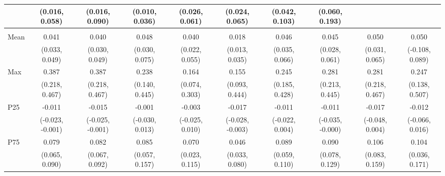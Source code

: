 {\begin{tabular}{l|c|c|c|c|c|c|c|c|c}
& {\scriptsize (0.016, 0.058)}
& {\scriptsize (0.016, 0.090)}
& {\scriptsize (0.010, 0.036)}
& {\scriptsize (0.026, 0.061)}
& {\scriptsize (0.024, 0.065)}
& {\scriptsize (0.042, 0.103)}
& {\scriptsize (0.060, 0.193)}
\\ [0.1cm]
\hline
\noalign{\smallskip}
\multicolumn{10}{l}{\textbf{Effect with Leads and Lags}} \\
\noalign{\smallskip}
\hline
Mean
& 0.041 & 0.040 & 0.048 & 0.040 & 0.018 & 0.046 & 0.045 & 0.050 & 0.050 \\
& {\scriptsize (0.033, 0.049)}
& {\scriptsize (0.030, 0.049)}
& {\scriptsize (0.030, 0.075)}
& {\scriptsize (0.022, 0.055)}
& {\scriptsize (0.013, 0.035)}
& {\scriptsize (0.035, 0.066)}
& {\scriptsize (0.028, 0.061)}
& {\scriptsize (0.031, 0.065)}
& {\scriptsize (-0.108, 0.089)}
\\ [0.1cm]
\hline
Max
& 0.387 & 0.387 & 0.238 & 0.164 & 0.155 & 0.245 & 0.281 & 0.281 & 0.247 \\
& {\scriptsize (0.218, 0.467)}
& {\scriptsize (0.218, 0.467)}
& {\scriptsize (0.140, 0.445)}
& {\scriptsize (0.074, 0.303)}
& {\scriptsize (0.093, 0.444)}
& {\scriptsize (0.185, 0.428)}
& {\scriptsize (0.213, 0.445)}
& {\scriptsize (0.218, 0.467)}
& {\scriptsize (0.138, 0.507)}
\\ [0.1cm]
\hline
P25
& -0.011 & -0.015 & -0.001 & -0.003 & -0.017 & -0.011 & -0.011 & -0.017 & -0.012 \\
& {\scriptsize (-0.023, -0.001)}
& {\scriptsize (-0.025, -0.001)}
& {\scriptsize (-0.030, 0.013)}
& {\scriptsize (-0.025, 0.010)}
& {\scriptsize (-0.028, -0.003)}
& {\scriptsize (-0.022, 0.004)}
& {\scriptsize (-0.035, -0.000)}
& {\scriptsize (-0.048, 0.004)}
& {\scriptsize (-0.066, 0.016)}
\\ [0.1cm]
\hline
P75
& 0.079 & 0.082 & 0.085 & 0.070 & 0.046 & 0.089 & 0.090 & 0.106 & 0.104 \\
& {\scriptsize (0.065, 0.090)}
& {\scriptsize (0.067, 0.092)}
& {\scriptsize (0.057, 0.157)}
& {\scriptsize (0.023, 0.115)}
& {\scriptsize (0.033, 0.080)}
& {\scriptsize (0.059, 0.110)}
& {\scriptsize (0.078, 0.129)}
& {\scriptsize (0.083, 0.159)}
& {\scriptsize (0.036, 0.171)}
\\ [0.1cm]
\hline
\hline
\end{tabular}
}
